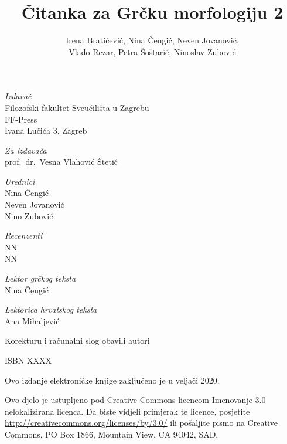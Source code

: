 \documentclass[a4paper,12pt,twoside]{report}
\def\secondpage{\clearpage\null\vfill
\pagestyle{empty}
\begin{minipage}[b]{0.9\textwidth}
\begin{center}
\textit{Izdavač}\\
Filozofski fakultet Sveučilišta u Zagrebu\\
FF-Press\\
Ivana Lučića 3, Zagreb

\bigskip

\textit{Za izdavača}\\
prof.\ dr.\ Vesna Vlahović Štetić

\bigskip

\textit{Urednici}\\
Nina Čengić\\
Neven Jovanović\\
Nino Zubović

\bigskip

\textit{Recenzenti}\\
NN\\
NN

\bigskip

\textit{Lektor grčkog teksta}\\
Nina Čengić

\textit{Lektorica hrvatskog teksta}\\
Ana Mihaljević

\bigskip

Korekturu i računalni slog obavili autori

\bigskip

ISBN XXXX

\bigskip

Ovo izdanje elektroničke knjige zaključeno je u veljači 2020.




\end{center}
\footnotesize\raggedright
\setlength{\parskip}{0.5\baselineskip}
\noindent Ovo djelo je ustupljeno pod Creative Commons licencom Imenovanje 3.0 nelokalizirana licenca. Da biste vidjeli primjerak te licence, posjetite \url{http://creativecommons.org/licenses/by/3.0/} ili pošaljite pismo na Creative Commons, PO Box 1866, Mountain View, CA 94042, SAD. 
\end{minipage}
\vspace*{3\baselineskip}
}
\begin{document}
\title{Čitanka za Grčku morfologiju 2}
\author{Irena Bratičević, Nina Čengić, Neven Jovanović,\\Vlado Rezar, Petra Šoštarić, Ninoslav Zubović}
\date{}
\secondpage
\end{document}
